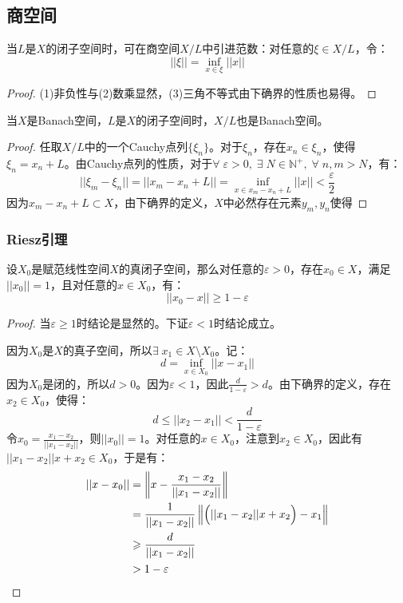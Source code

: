 \subsection{商空间}
\begin{definition}
	当$L$是$X$的闭子空间时，可在商空间$X/L$中引进范数：对任意的$\xi\in X/L$，令：
	\begin{equation*}
		||\xi||=\inf_{x\in\xi}||x||
	\end{equation*}
\end{definition}
\begin{proof}
	(1)非负性与(2)数乘显然，(3)三角不等式由下确界的性质也易得。
\end{proof}
\begin{theorem}
	当$X$是Banach空间，$L$是$X$的闭子空间时，$X/L$也是Banach空间。
\end{theorem}
\begin{proof}
	任取$X/L$中的一个Cauchy点列$\{\xi_n\}$。对于$\xi_n$，存在$x_n\in \xi_n$，使得$\xi_n=x_n+L$。由Cauchy点列的性质，对于$\forall\;\varepsilon>0,\;\exists\;N\in\mathbb{N}^+,\;\forall\;n,m>N$，有：
	\begin{equation*}
		||\xi_m-\xi_n||=||x_m-x_n+L||=\inf_{x\in x_m-x_n+L}||x||<\frac{\varepsilon}{2}
	\end{equation*}
	因为$x_m-x_n+L\subset X$，由下确界的定义，$X$中必然存在元素$y_m,y_n$使得
\end{proof}
\subsubsection{Riesz引理}
\begin{lemma}
	设$X_0$是赋范线性空间$X$的真闭子空间，那么对任意的$\varepsilon>0$，存在$x_0\in X$，满足$||x_0||=1$，且对任意的$x\in X_0$，有：
	\begin{equation*}
		||x_0-x||\geqslant 1-\varepsilon
	\end{equation*}
\end{lemma}
\begin{proof}
	当$\varepsilon\geqslant1$时结论是显然的。下证$\varepsilon<1$时结论成立。\par
	因为$X_0$是$X$的真子空间，所以$\exists\;x_1\in X\setminus X_0$。记：
	\begin{equation*}
		d=\inf_{x\in X_0}||x-x_1||
	\end{equation*}
	因为$X_0$是闭的，所以$d>0$。因为$\varepsilon<1$，因此$\frac{d}{1-\varepsilon}>d$。由下确界的定义，存在$x_2\in X_0$，使得：
	\begin{equation*}
		d\leqslant||x_2-x_1||<\frac{d}{1-\varepsilon}
	\end{equation*}
	令$x_0=\frac{x_1-x_2}{||x_1-x_2||}$，则$||x_0||=1$。对任意的$x\in X_0$，注意到$x_2\in X_0$，因此有$||x_1-x_2||x+x_2\in X_0$，于是有：
	\begin{align*}
		||x-x_0||&=\left\|x-\frac{x_1-x_2}{||x_1-x_2||}\right\| \\
		&=\frac{1}{||x_1-x_2||}\left\|\Bigl(||x_1-x_2||x+x_2\Bigr)-x_1\right\| \\
		&\geqslant\frac{d}{||x_1-x_2||} \\
		&>1-\varepsilon\qedhere
	\end{align*}
\end{proof}


